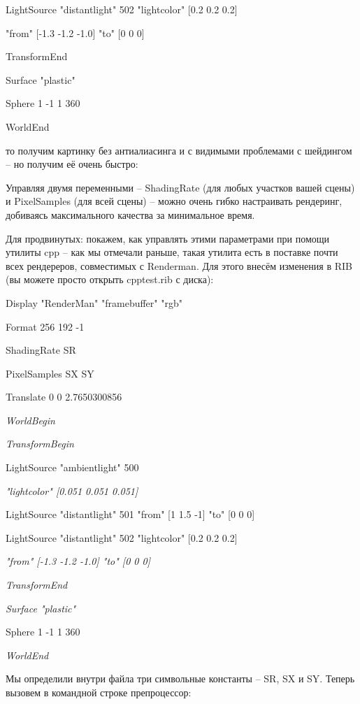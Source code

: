     LightSource
    "distantlight" 502 "lightcolor" [0.2 0.2 0.2]
  

                "from" [-1.3 -1.2 -1.0] "to" [0 0 0]
  

  TransformEnd
  

   Surface "plastic"
  

   Sphere 1 -1 1 360
  

WorldEnd
  

 то получим картинку без антиалиасинга и с видимыми
    проблемами с шейдингом – но получим её очень быстро:
  

  

 Управляя двумя переменными – ShadingRate (для любых
    участков вашей сцены) и PixelSamples (для всей сцены) – можно очень
    гибко настраивать рендеринг, добиваясь максимального качества за
    минимальное время.
  

 Для
    продвинутых: покажем, как управлять
    этими параметрами при помощи утилиты cpp – как мы отмечали раньше,
    такая утилита есть в поставке почти всех рендереров, совместимых с
    Renderman. Для этого внесём изменения в RIB (вы можете просто
    открыть cpptest.rib с диска):
  

Display
    "RenderMan" "framebuffer" "rgb"
  

Format
    256 192 -1
  

ShadingRate
    SR
  

PixelSamples
    SX SY
  

Translate
    0 0 2.7650300856
  

{\it WorldBegin}
  

{\it    TransformBegin}
  

     LightSource "ambientlight"
    500
  

{\it                  "lightcolor" [0.051 0.051 0.051]}
  

     LightSource "distantlight" 501 "from" [1
    1.5 -1] "to" [0 0 0]
  

     LightSource "distantlight" 502
    "lightcolor" [0.2 0.2 0.2]
  

{\it                  "from" [-1.3 -1.2 -1.0] "to" [0 0 0]}
  

{\it    TransformEnd}
  

{\it    Surface "plastic"}
  

{\it   }  Sphere 1 -1 1 360
  

{\it  WorldEnd}
  

 Мы определили
    внутри файла три символьные константы – SR, SX и SY. Теперь вызовем
    в командной строке препроцессор:
  

